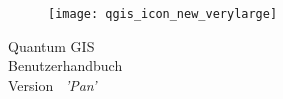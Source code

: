 
\begin{titlepage}
\begin{center}

\begin{figure}[H]
\begin{center}
\texttt{[image: qgis\_icon\_new\_verylarge]} 
\end{center}
\end{figure}

\Huge{Quantum GIS}\\
\vspace{0.5cm}
\Large{Benutzerhandbuch} \\
\vspace{0.5cm}
\Large{Version ~\CURRENT \textsl{'Pan'}}

\end{center}
\end{titlepage}
